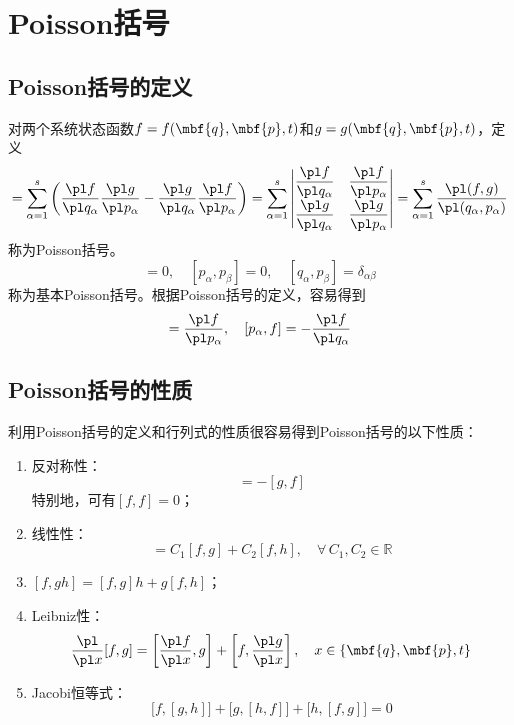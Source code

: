 \section{Poisson括号}

\subsection{Poisson括号的定义}

对两个系统状态函数$f = f(\mbf{q},\mbf{p},t)$和$g = g(\mbf{q},\mbf{p},t)$，定义
\begin{equation}
	[f,g] = \sum_{\alpha=1}^s \left(\frac{\pl f}{\pl q_\alpha} \frac{\pl g}{\pl p_\alpha} - \frac{\pl g}{\pl q_\alpha} \frac{\pl f}{\pl p_\alpha}\right) = \sum_{\alpha=1}^s \begin{vmatrix} \dfrac{\pl f}{\pl q_\alpha} & \dfrac{\pl f}{\pl p_\alpha} \\[1.5ex] \dfrac{\pl g}{\pl q_\alpha} & \dfrac{\pl g}{\pl p_\alpha} \end{vmatrix} = \sum_{\alpha=1}^s \frac{\pl (f,g)}{\pl (q_\alpha,p_\alpha)}
\end{equation}
称为{\heiti Poisson括号}。
\begin{equation}
	[q_\alpha,q_\beta] = 0,\quad [p_\alpha,p_\beta] = 0,\quad [q_\alpha,p_\beta] = \delta_{\alpha\beta}
	\label{基本Poisson括号}
\end{equation}
称为{\heiti 基本Poisson括号}。根据Poisson括号的定义，容易得到
\begin{equation}
	[q_\alpha, f] =\frac{\pl f}{\pl p_\alpha},\quad [p_\alpha,f] = -\frac{\pl f}{\pl q_\alpha}
\end{equation}

\subsection{Poisson括号的性质}

利用Poisson括号的定义和行列式的性质很容易得到Poisson括号的以下性质：
\begin{enumerate}
	\item 反对称性：
	\begin{equation*}
		[f,g] = -[g,f]
	\end{equation*}
	特别地，可有$[f,f] = 0$；
	\item 线性性：
	\begin{equation*}
		[f,C_1 g+C_2 h] = C_1[f,g] + C_2[f,h],\quad \forall \, C_1,C_2 \in \mathbb{R}
	\end{equation*}
	\item $[f,gh] = [f,g]h+g[f,h]$；
	\item Leibniz性：
	\begin{equation*}
		\frac{\pl}{\pl x} [f,g] = \left[\frac{\pl f}{\pl x},g\right] + \left[f,\frac{\pl g}{\pl x}\right],\quad x \in \{\mbf{q},\mbf{p},t\}
	\end{equation*}
	\item Jacobi恒等式：
	\begin{equation*}
		\big[f,[g,h]\big] + \big[g,[h,f]\big] + \big[h,[f,g]\big] = 0
	\end{equation*}
\end{enumerate}

